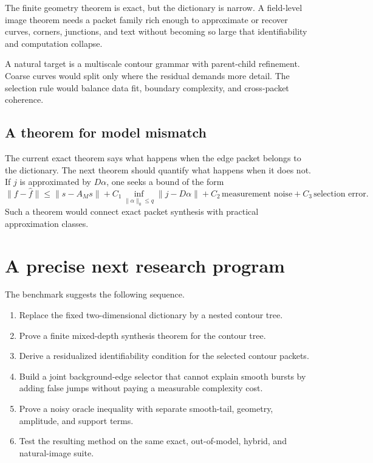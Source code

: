 \documentclass[11pt,oneside,openany]{book}
\theoremstyle{definition}
\theoremstyle{remark}
\begin{document}
The finite geometry theorem is exact, but the dictionary is narrow. A field-level image theorem needs a packet family rich enough to approximate or recover curves, corners, junctions, and text without becoming so large that identifiability and computation collapse.

A natural target is a multiscale contour grammar with parent-child refinement. Coarse curves would split only where the residual demands more detail. The selection rule would balance data fit, boundary complexity, and cross-packet coherence.

\section{A theorem for model mismatch}

The current exact theorem says what happens when the edge packet belongs to the dictionary. The next theorem should quantify what happens when it does not. If $j$ is approximated by $D\alpha$, one seeks a bound of the form
\[
\|f-\widehat f\|
\le
\|s-A_Ms\|
+
C_1\inf_{\|\alpha\|_0\le q}\|j-D\alpha\|
+
C_2\,\text{measurement noise}
+
C_3\,\text{selection error}.
\]
Such a theorem would connect exact packet synthesis with practical approximation classes.

\chapter{A precise next research program}

The benchmark suggests the following sequence.

\begin{enumerate}[leftmargin=2em]
\item Replace the fixed two-dimensional dictionary by a nested contour tree.
\item Prove a finite mixed-depth synthesis theorem for the contour tree.
\item Derive a residualized identifiability condition for the selected contour packets.
\item Build a joint background-edge selector that cannot explain smooth bursts by adding false jumps without paying a measurable complexity cost.
\item Prove a noisy oracle inequality with separate smooth-tail, geometry, amplitude, and support terms.
\item Test the resulting method on the same exact, out-of-model, hybrid, and natural-image suite.
\end{enumerate}
\end{document}
